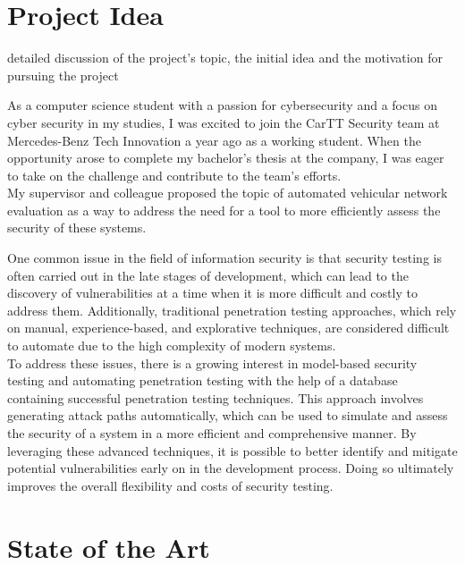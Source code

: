 \chapter{Project Idea}
\label{chp:idea}

\begin{shaded}
\noindent
detailed discussion of the project's topic, the initial idea and the motivation for pursuing the project
\end{shaded}

As a computer science student with a passion for cybersecurity and a focus on cyber security in my studies, 
I was excited to join the CarTT Security team at Mercedes-Benz Tech Innovation a year ago as a working student. 
When the opportunity arose to complete my bachelor's thesis at the company, 
I was eager to take on the challenge and contribute to the team's efforts.\\

My supervisor and colleague proposed the topic of automated vehicular network evaluation as a way 
to address the need for a tool to more efficiently assess the security of these systems.

One common issue in the field of information security is that security testing is often carried out in the late stages of development, 
which can lead to the discovery of vulnerabilities at a time when it is more difficult and costly to address them. 
Additionally, traditional penetration testing approaches, 
which rely on manual, experience-based, and explorative techniques, 
are considered difficult to automate due to the high complexity of modern systems.\\

To address these issues, there is a growing interest in model-based security testing and 
automating penetration testing with the help of a database containing successful penetration testing techniques. 
This approach involves generating attack paths automatically, 
which can be used to simulate and assess the security of a system in a more efficient and comprehensive manner. 
By leveraging these advanced techniques, 
it is possible to better identify and mitigate potential vulnerabilities early on in the development process.
Doing so ultimately improves the overall flexibility and costs of security testing.\\


\chapter{State of the Art}
\label{chp:stateoftheart}

